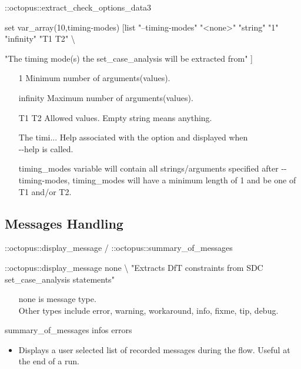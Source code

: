 \documentclass[handout]{beamer}
\begin{document}
\begin{frame}[fragile]{::octopus::extract\_check\_options\_data}{3}
	{\tiny
	\begin{semiverbatim}
	set var_array(10,\alert<5>{timing-modes})	[list "--timing-modes" "<none>" "string" "\alert<1>{1}" "\alert<2>{infinity}" "\alert<3>{T1 T2}" \textbackslash
	
    "\alert<4>{The timing mode(s) the set_case_analysis will be extracted from}" ]
	\end{semiverbatim}
	}
	\begin{itemize}[<+->]
	\item [1] Minimum number of arguments(values).
	\item [infinity] Maximum number of arguments(values).
	\item [T1 T2] Allowed values. Empty string means anything.
	\item [{\small The timi...}] Help associated with the option and displayed when \\
	-{}-help is called.
	\item [{\tiny timing\_modes}] variable will contain all strings/arguments specified after -{}-timing-modes, \alert{timing\_modes} will have a minimum length of 1 and be one of T1 and/or T2.
	\end{itemize}
\end{frame}

\subsection{Messages Handling}
\begin{frame}[fragile]{::octopus::display\_message / ::octopus::summary\_of\_messages}
	\begin{semiverbatim}
	{\small
::octopus::display_message \alert{none} \textbackslash 
    "Extracts DfT constraints from SDC set_case_analysis statements"}
	\end{semiverbatim}
	\begin{itemize}
	\item [none] is message type. \\
	Other types include \alert{error}, \alert{warning}, \alert{workaround}, \alert{info}, \alert{fixme}, \alert{tip}, \alert{debug}.
	\end{itemize}
	\pause	
	\begin{semiverbatim}
		summary_of_messages infos errors
	\end{semiverbatim}
	\begin{itemize}
	\item Displays a user selected list of recorded messages during the flow. Useful at the end of a run.
	\end{itemize}
\end{frame}
\end{document}
